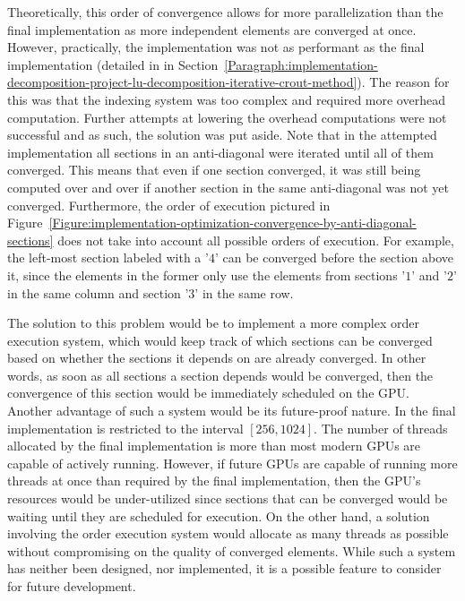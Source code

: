 Theoretically, this order of convergence allows for more parallelization than the final implementation as more independent elements are converged at once. However, practically, the implementation was not as performant as the final implementation (detailed in \textit{} in Section~\ref{Paragraph:implementation-decomposition-project-lu-decomposition-iterative-crout-method}). The reason for this was that the indexing system was too complex and required more overhead computation. Further attempts at lowering the overhead computations were not successful and as such, the solution was put aside. Note that in the attempted implementation all sections in an anti-diagonal were iterated until all of them converged. This means that even if one section converged, it was still being computed over and over if another section in the same anti-diagonal was not yet converged. Furthermore, the order of execution pictured in Figure~\ref{Figure:implementation-optimization-convergence-by-anti-diagonal-sections} does not take into account all possible orders of execution. For example, the left-most section labeled with a '$ 4 $' can be converged before the section above it, since the elements in the former only use the elements from sections '$ 1 $' and '$ 2 $' in the same column and section '$ 3 $' in the same row.
\par The solution to this problem would be to implement a more complex order execution system, which would keep track of which sections can be converged based on whether the sections it depends on are already converged. In other words, as soon as all sections a section depends would be converged, then the convergence of this section would be immediately scheduled on the GPU. \\
Another advantage of such a system would be its future-proof nature. In the final implementation  is restricted to the interval $ \left[256, 1024\right] $. The number of threads allocated by the final implementation is more than most modern GPUs are capable of actively running. However, if future GPUs are capable of running more threads at once than required by the final implementation, then the GPU's resources would be under-utilized since sections that can be converged would be waiting until they are scheduled for execution. On the other hand, a solution involving the order execution system would allocate as many threads as possible without compromising on the quality of converged elements. While such a system has neither been designed, nor implemented, it is a possible feature to consider for future development.